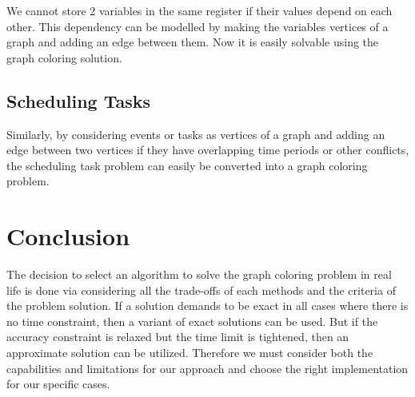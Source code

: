 \documentclass[14pt]{extreport}
\begin{document}
    		We cannot store 2 variables in the same register if their values depend on each other. This dependency can be modelled by making the variables vertices of a graph and adding an edge between them. Now it is easily solvable using the graph coloring solution.
	
    	\section{Scheduling Tasks}
    	    Similarly, by considering events or tasks as vertices of a graph and adding an edge between two vertices if they have overlapping time periods or other conflicts, the scheduling task problem can easily be converted into a graph coloring problem.
        
	\pagebreak
	
	\chapter{Conclusion}
	
	The decision to select an algorithm to solve the graph coloring problem in real life is done via considering all the trade-offs of each methods and the criteria of the problem solution. If a solution demands to be exact in all cases where there is no time constraint, then a variant of exact solutions can be used. But if the accuracy constraint is relaxed but the time limit is tightened, then an approximate solution can be utilized. Therefore we must consider both the capabilities and limitations for our approach and choose the right implementation for our specific cases.
	
	\pagebreak
	
	\nocite{*} 
	\printbibliography
	
	
	
\end{document}
